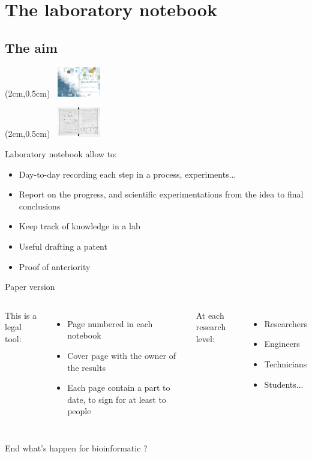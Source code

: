 \section{The laboratory notebook}
\subsection*{The aim}
\begin{frame}
  \begin{textblock*}{5cm}(2cm,0.5cm) %
  \includegraphics[width=2.3cm,height=1.3cm]{images/cahierlabo.png}
  \end{textblock*}
  \begin{textblock*}{5cm}(2cm,0.5cm) %
  \includegraphics[width=2.3cm,height=1.3cm]{images/cahier2.pdf}
  \end{textblock*}

Laboratory notebook allow to:
\begin{itemize}
	\item Day-to-day recording each step in a process, experiments...
	\item Report on the progress, and scientific experimentations from the idea to final conclusions
	\item Keep track of knowledge in a lab
	\item Useful drafting a patent
	\item Proof of anteriority
\end{itemize}
\end{frame}

\begin{frame}{Paper version}
\begin{columns}
This is a legal tool:
 \begin{itemize}
 \item Page numbered in each notebook
 \item Cover page with the owner of the results
 \item Each page contain a part to date, to sign for at least to people
 \end{itemize}
At each research level:
  \begin{itemize}
 \item Researchers
 \item Engineers
 \item Technicians
 \item Students...
 \end{itemize}
\end{columns}
\vspace{1cm}
\centering End what's happen for bioinformatic ?
\end{frame}

